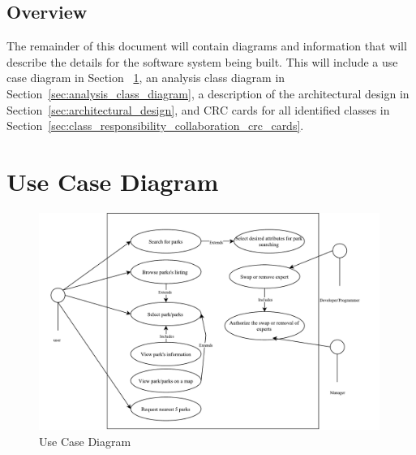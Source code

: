 \documentclass[titlepage,12pt]{article}
\begin{document}

\subsection{Overview}
\label{sub:overview}

The remainder of this document will contain diagrams and information that will describe the details
for the software system being built. This will include a use case diagram in Section~
\ref{sec:use_case_diagram}, an analysis class diagram in Section~\ref{sec:analysis_class_diagram}, a
description of the architectural design in Section~\ref{sec:architectural_design}, and CRC cards for
all identified classes in Section~\ref{sec:class_responsibility_collaboration_crc_cards}.



\section{Use Case Diagram}
\label{sec:use_case_diagram}

\begin{figure}[htbp]
\centerline{\includegraphics[width=0.99\textwidth]{images//UseCase}}
\caption{Use Case Diagram}
\label{useCaseDiagram}
\end{figure}
\end{document}
